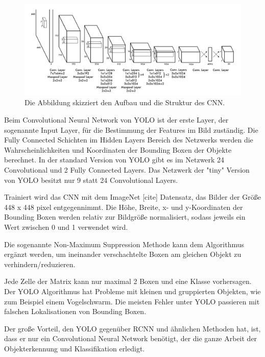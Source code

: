 \begin{figure}[h]
    \centering
    \includegraphics[width=\linewidth]{images/YOLO_network.PNG}
    \caption{Die Abbildung skizziert den Aufbau und die Struktur des CNN.}
    \label{fig:my_label}
\end{figure}
Beim Convolutional Neural Network von YOLO ist der erste Layer, der sogenannte Input Layer, für die Bestimmung der Features im Bild zuständig. Die Fully Connected Schichten im Hidden Layers Bereich des Netzwerks werden die Wahrscheinlichkeiten und Koordinaten der Bounding Boxen der Objekte berechnet. In der standard Version von YOLO gibt es im Netzwerk 24 Convolutional und 2 Fully Connected Layers. Das Netzwerk der "tiny" Version von YOLO besitzt nur 9 statt 24 Convolutional Layers.\par
Trainiert wird das CNN mit dem ImageNet [cite] Datensatz, das Bilder der Größe 448 x 448 pixel entgegennimmt. Die Höhe, Breite, x- und y-Koordinaten der Bounding Boxen werden relativ zur Bildgröße normalisiert, sodass jeweils ein Wert zwischen 0 und 1 verwendet wird.\par
Die sogenannte Non-Maximum Suppression Methode kann dem Algorithmus ergänzt werden, um ineinander verschachtelte Boxen am gleichen Objekt zu verhindern/reduzieren.\par
Jede Zelle der Matrix kann nur maximal 2 Boxen und eine Klasse vorhersagen. Der YOLO Algorithmus hat Probleme mit kleinen und gruppierten Objekten, wie zum Beispiel einem Vogelschwarm. Die meisten Fehler unter YOLO passieren mit falschen Lokalisationen von Bounding Boxen.\par
Der große Vorteil, den YOLO gegenüber RCNN und ähnlichen Methoden hat, ist, dass er nur ein Convolutional Neural Network benötigt, der die ganze Arbeit der Objekterkennung und Klassifikation erledigt.

